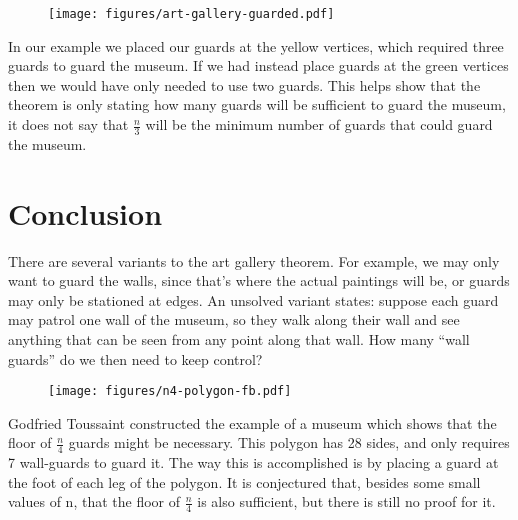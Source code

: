 \documentclass[10pt]{amsart}
\begin{document}
\begin{figure}[h!]
    \centering
    \texttt{[image: figures/art-gallery-guarded.pdf]}
\end{figure}

In our example we placed our guards at the yellow vertices, which required three guards to guard the
museum. If we had instead place guards at the green vertices then we would have only needed to use 
two guards. This helps show that the theorem is only stating how many guards will be sufficient to
guard the museum, it does not say that $\frac{n}{3}$ will be the minimum number of guards that could
guard the museum.



\pagebreak

\section{Conclusion}

There are several variants to the art gallery theorem. 
For example, we may only want to guard the walls, since that's where the actual 
paintings will be, or guards may only be stationed at edges. 
An unsolved variant states: suppose each guard may patrol one wall of the museum, 
so they walk along their wall and see anything that can be seen from any point 
along that wall. How many ``wall guards'' do we then need to keep control?

\begin{figure}[h!]
    \centering
    \texttt{[image: figures/n4-polygon-fb.pdf]}
\end{figure}

Godfried Toussaint constructed the example of a museum which shows that 
the floor of $\frac{n}{4}$ guards might be necessary. 
This polygon has 28 sides, and only requires 7 wall-guards to guard it. 
The way this is accomplished is by placing a guard at the foot of each leg 
of the polygon.
It is conjectured that, besides some small values of n, that the floor of $\frac{n}{4}$ is 
also sufficient, but there is still no proof for it.
\end{document}
